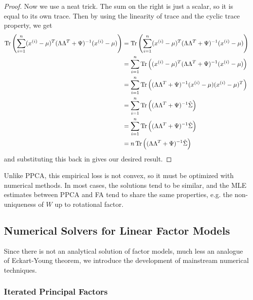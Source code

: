 \begin{proof}
    Now we use a neat trick. The sum on the right is just a scalar, so it is equal to its own trace. Then by using the linearity of trace and the cyclic trace property, we get 
    \begin{align}
      \operatorname{Tr} \left( \sum_{i=1}^n (x^{(i)} - \mu)^T (\Lambda \Lambda^T + \Psi)^{-1} (x^{(i)} - \mu) \right) 
      & = \operatorname{Tr} \left( \sum_{i=1}^n (x^{(i)} - \mu)^T (\Lambda \Lambda^T + \Psi)^{-1} (x^{(i)} - \mu) \right) \\ 
      & = \sum_{i=1}^n \operatorname{Tr} \left( (x^{(i)} - \mu)^T (\Lambda \Lambda^T + \Psi)^{-1} (x^{(i)} - \mu) \right) \\ 
      & = \sum_{i=1}^n \operatorname{Tr} \left( (\Lambda \Lambda^T + \Psi)^{-1} (x^{(i)} - \mu) (x^{(i)} - \mu)^T \right) \\ 
      & = \sum_{i=1}^n \operatorname{Tr} \left( (\Lambda \Lambda^T + \Psi)^{-1} \hat{\Sigma} \right) \\ 
      & = \sum_{i=1}^n \operatorname{Tr} \left( (\Lambda \Lambda^T + \Psi)^{-1} \hat{\Sigma} \right) \\ 
      & = n \operatorname{Tr} \left( (\Lambda \Lambda^T + \Psi)^{-1} \hat{\Sigma} \right)
    \end{align}
    and substituting this back in gives our desired result. 
  \end{proof}

  Unlike PPCA, this empirical loss is not convex, so it must be optimized with numerical methods. In most cases, the solutions tend to be similar, and the MLE estimates between PPCA and FA tend to share the same properties, e.g. the non-uniqueness of $W$ up to rotational factor. 

\subsection{Numerical Solvers for Linear Factor Models}
  
  Since there is not an analytical solution of factor models, much less an analogue of Eckart-Young theorem, we introduce the development of mainstream numerical techniques. 

\subsubsection{Iterated Principal Factors}

  \begin{algo}
    
  \end{algo}

